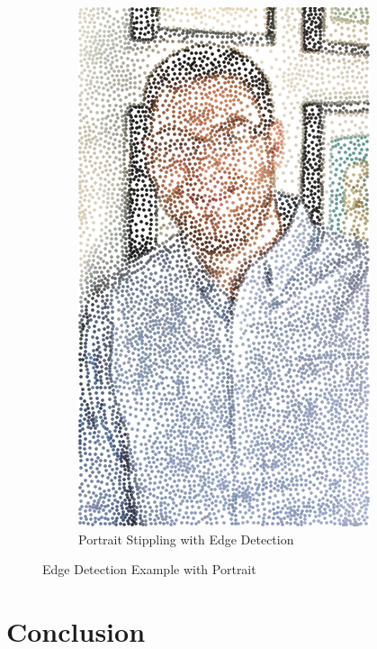\documentclass[11pt]{article}
\begin{document}
\begin{figure}[H]
\begin{subfigure}[b]{.48\linewidth}
		\includegraphics[width=\linewidth]{Portrait-7000-2}
		\caption{Portrait Stippling with Edge Detection}
		\label{fig:traxin3}
	\end{subfigure}
	\caption{Edge Detection Example with Portrait}
	\label{fig:mountRusdxdhmoreEx}
\end{figure}

\section{Conclusion}
\end{document}
